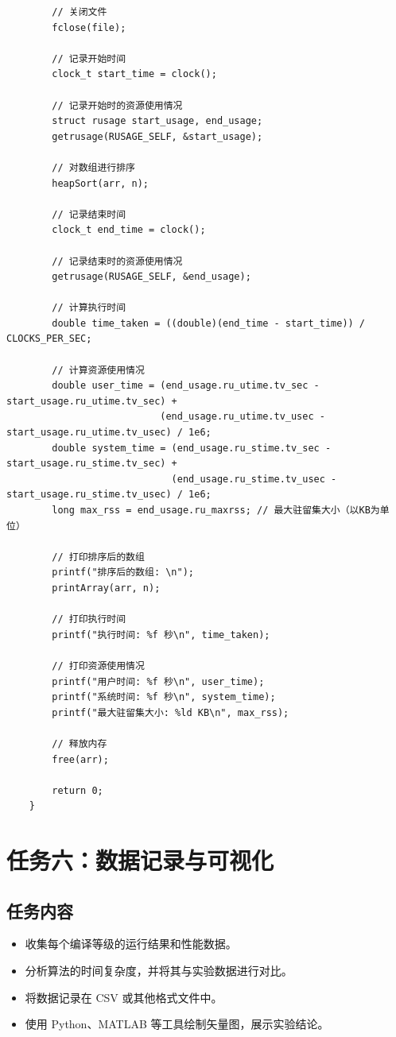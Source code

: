 \documentclass[UTF8]{ctexart}
\begin{document}
\begin{lstlisting}
        // 关闭文件
        fclose(file);
    
        // 记录开始时间
        clock_t start_time = clock();
    
        // 记录开始时的资源使用情况
        struct rusage start_usage, end_usage;
        getrusage(RUSAGE_SELF, &start_usage);
    
        // 对数组进行排序
        heapSort(arr, n);
    
        // 记录结束时间
        clock_t end_time = clock();
    
        // 记录结束时的资源使用情况
        getrusage(RUSAGE_SELF, &end_usage);
    
        // 计算执行时间
        double time_taken = ((double)(end_time - start_time)) / CLOCKS_PER_SEC;
    
        // 计算资源使用情况
        double user_time = (end_usage.ru_utime.tv_sec - start_usage.ru_utime.tv_sec) +
                           (end_usage.ru_utime.tv_usec - start_usage.ru_utime.tv_usec) / 1e6;
        double system_time = (end_usage.ru_stime.tv_sec - start_usage.ru_stime.tv_sec) +
                             (end_usage.ru_stime.tv_usec - start_usage.ru_stime.tv_usec) / 1e6;
        long max_rss = end_usage.ru_maxrss; // 最大驻留集大小（以KB为单位）
    
        // 打印排序后的数组
        printf("排序后的数组: \n");
        printArray(arr, n);
    
        // 打印执行时间
        printf("执行时间: %f 秒\n", time_taken);
    
        // 打印资源使用情况
        printf("用户时间: %f 秒\n", user_time);
        printf("系统时间: %f 秒\n", system_time);
        printf("最大驻留集大小: %ld KB\n", max_rss);
    
        // 释放内存
        free(arr);
    
        return 0;
    }
\end{lstlisting}

\section{任务六：数据记录与可视化}
\subsection{任务内容}
\begin{itemize}
    \item 收集每个编译等级的运行结果和性能数据。
    \item 分析算法的时间复杂度，并将其与实验数据进行对比。
    \item 将数据记录在 CSV 或其他格式文件中。
    \item 使用 Python、MATLAB 等工具绘制矢量图，展示实验结论。
\end{itemize}
\end{document}
